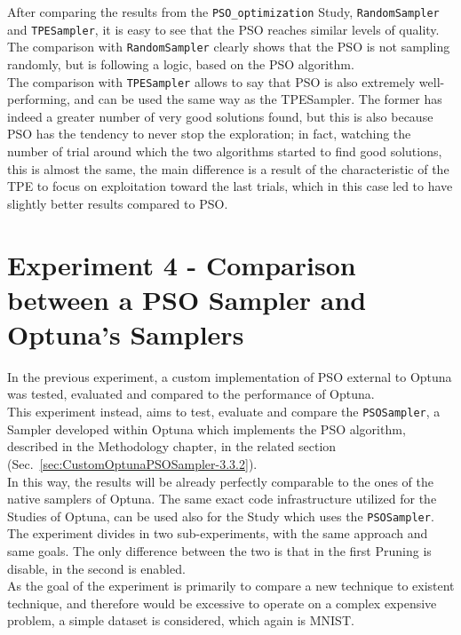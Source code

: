 After comparing the results from the \texttt{PSO\_optimization} Study, \texttt{RandomSampler} and \texttt{TPESampler}, it is easy to see that the PSO reaches similar levels of quality.
\\[0.3cm]The comparison with \texttt{RandomSampler} clearly shows that the PSO is not sampling randomly, but is following a logic, based on the PSO algorithm.
\\[0.3cm]The comparison with \texttt{TPESampler} allows to say that PSO is also extremely well-performing, and can be used the same way as the TPESampler. The former has indeed a greater number of very good solutions found, but this is also because PSO has the tendency to never stop the exploration; in fact, watching the number of trial around which the two algorithms started to find good solutions, this is almost the same, the main difference is a result of the characteristic of the TPE to focus on exploitation toward the last trials, which in this case led to have slightly better results compared to PSO.

\section{Experiment 4 - Comparison between a PSO Sampler and Optuna's Samplers}

In the previous experiment, a custom implementation of PSO external to Optuna was tested, evaluated and compared to the performance of Optuna.
\\[0.3cm]This experiment instead, aims to test, evaluate and compare the \texttt{PSOSampler}, a Sampler developed within Optuna which implements the PSO algorithm, described in the Methodology chapter, in the related section (Sec.~\ref{sec:CustomOptunaPSOSampler-3.3.2}).
\\[0.3cm]In this way, the results will be already perfectly comparable to the ones of the native samplers of Optuna. The same exact code infrastructure utilized for the Studies of Optuna, can be used also for the Study which uses the \texttt{PSOSampler}.
\\[0.3cm]The experiment divides in two sub-experiments, with the same approach and same goals. The only difference between the two is that in the first Pruning is disable, in the second is enabled.
\\[0.3cm]As the goal of the experiment is primarily to compare a new technique to existent technique, and therefore would be excessive to operate on a complex expensive problem, a simple dataset is considered, which again is MNIST.

